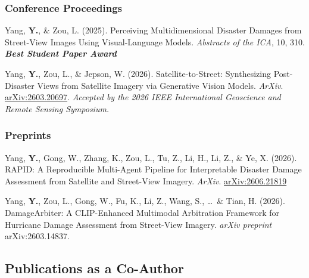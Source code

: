 \documentclass[10pt,letterpaper]{article}
\newenvironment{reflist}
  {\begin{list}{}{%
     \setlength{\leftmargin}{1.7em}\setlength{\itemindent}{-1.7em}%
     \setlength{\itemsep}{0.22em}\setlength{\parsep}{0pt}\setlength{\topsep}{0.25em}}}
  {\end{list}}
\newcommand{\award}[1]{\textbf{\textit{#1}}}
\begin{document}
\subsubsection{Conference Proceedings}
\begin{reflist}
  \item[] [1] Yang, \textbf{Y.}, \& Zou, L. (2025). Perceiving Multidimensional Disaster Damages from Street-View Images Using Visual-Language Models. \textit{Abstracts of the ICA}, 10, 310. \award{Best Student Paper Award}
  \item[] [2] Yang, \textbf{Y.}, Zou, L., \& Jepson, W. (2026). Satellite-to-Street: Synthesizing Post-Disaster Views from Satellite Imagery via Generative Vision Models. \textit{ArXiv}. \href{https://arxiv.org/abs/2603.20697}{arXiv:2603.20697}. \textit{Accepted by the 2026 IEEE International Geoscience and Remote Sensing Symposium.}
\end{reflist}

\subsubsection{Preprints}
\begin{reflist}
  \item[] [1] Yang, \textbf{Y.}, Gong, W., Zhang, K., Zou, L., Tu, Z., Li, H., Li, Z., \& Ye, X. (2026). RAPID: A Reproducible Multi-Agent Pipeline for Interpretable Disaster Damage Assessment from Satellite and Street-View Imagery. \textit{ArXiv}. \href{https://arxiv.org/abs/2606.21819}{arXiv:2606.21819}
  \item[] [2] Yang, \textbf{Y.}, Zou, L., Gong, W., Fu, K., Li, Z., Wang, S., \ldots\ \& Tian, H. (2026). DamageArbiter: A CLIP-Enhanced Multimodal Arbitration Framework for Hurricane Damage Assessment from Street-View Imagery. \textit{arXiv preprint} arXiv:2603.14837.
\end{reflist}

\subsection{Publications as a Co-Author}
\end{document}
